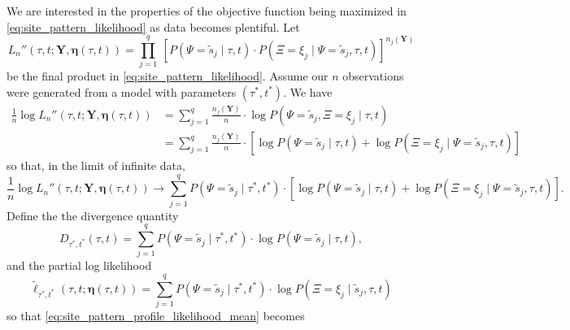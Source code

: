 \documentclass[a4paper]{article}
\newcommand{\fullAlignment}{\mathbf{Y}}
\newcommand{\siteSplit}{\tilde{s}}
\newcommand{\fullAncestralSplitPartitions}{\boldsymbol\eta}
\newcommand{\siteSplitRV}{\Psi}
\newcommand{\ancestralSplitRV}{\Xi}
\newcommand{\nCols}{n}
\newcommand{\nSiteSplits}{q}
\newcommand{\shannonDivergence}{D}
\begin{document}
We are interested in the properties of the objective function being maximized in \eqref{eq:site_pattern_likelihood} as data becomes plentiful.
Let
$$
L_\nCols''(\tau, t; \fullAlignment, \fullAncestralSplitPartitions(\tau, t)) = \prod_{j=1}^{\nSiteSplits} \ \left[P(\siteSplitRV=\siteSplit_j \mid \tau, t) \cdot P(\ancestralSplitRV=\xi_j \mid \siteSplitRV=\siteSplit_j, \tau, t)\right] ^{\nCols_j(\fullAlignment)}
$$
be the final product in \eqref{eq:site_pattern_likelihood}.
Assume our $\nCols$ observations were generated from a model with parameters $(\tau^*, t^*)$.
We have
\begin{align}
    \frac{1}{\nCols} \log L_\nCols''(\tau, t; \fullAlignment, \fullAncestralSplitPartitions(\tau,t))
        &= \sum_{j=1}^\nSiteSplits \frac{\nCols_j(\fullAlignment)}{\nCols}\cdot  \log P(\siteSplitRV=\siteSplit_j, \ancestralSplitRV=\xi_j \mid \tau, t) \\
        &= \sum_{j=1}^\nSiteSplits \frac{\nCols_j(\fullAlignment)}{\nCols}\cdot [\log P(\siteSplitRV=\siteSplit_j \mid \tau, t) +
            \log P(\ancestralSplitRV=\xi_j \mid \siteSplitRV=\siteSplit_j , \tau, t)]
\end{align}
so that, in the limit of infinite data,
\begin{equation}
    \frac{1}{\nCols} \log L_\nCols''(\tau, t; \fullAlignment, \fullAncestralSplitPartitions(\tau, t)) \rightarrow \sum_{j=1}^\nSiteSplits P(\siteSplitRV=\siteSplit_j \mid \tau^*, t^*) \cdot [\log P(\siteSplitRV=\siteSplit_j \mid \tau, t) + \log P(\ancestralSplitRV=\xi_j \mid \siteSplitRV=\siteSplit_j , \tau, t)]. \label{eq:site_pattern_profile_likelihood_mean}
\end{equation}
Define the the divergence quantity
$$
\shannonDivergence_{\tau^*,t^*}(\tau,t) = \sum_{j=1}^\nSiteSplits P(\siteSplitRV=\siteSplit_j \mid \tau^*, t^*)\cdot\log P(\siteSplitRV=\siteSplit_j \mid \tau, t),
$$
and the partial log likelihood
$$
\tilde{\ell}_{\tau^*,t^*}(\tau, t; \fullAncestralSplitPartitions(\tau,t)) = \sum_{j=1}^\nSiteSplits P(\siteSplitRV=\siteSplit_j \mid \tau^*, t^*)\cdot\log P(\ancestralSplitRV=\xi_j \mid \siteSplit_j, \tau, t)
$$
so that \eqref{eq:site_pattern_profile_likelihood_mean} becomes
\end{document}
